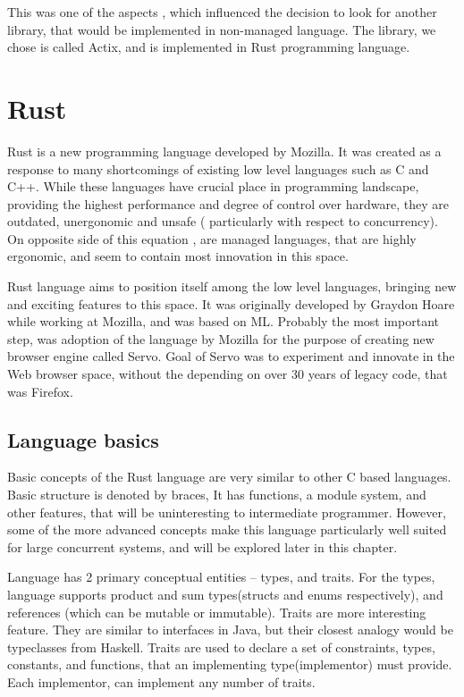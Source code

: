 
This was one of the aspects , which influenced the decision to look for another library, that would be implemented in
non-managed language. The library, we chose is called Actix\cite{web:actix}, and is implemented in Rust\cite{Blandy:2015:RPL:3019371}
programming language.

\section{Rust}
Rust is a new programming language developed by Mozilla. It was created as a response to many shortcomings of existing low level
languages such as C and C++. While these languages have crucial place in programming landscape, providing the highest performance and
degree of control over hardware, they are outdated, unergonomic and unsafe ( particularly with respect to concurrency). On opposite
side of this equation , are managed languages, that are highly ergonomic, and seem to contain most innovation in this space.

Rust language aims to position itself among the low level languages, bringing new and exciting features to this space.
It was originally developed by Graydon Hoare\cite{web:rust_progress} while working at Mozilla, and was based on
ML. Probably the most important step, was adoption of the language by Mozilla for the purpose of creating new browser engine
called Servo\cite{proc:servo}. Goal of Servo was to experiment and innovate in the Web browser space, without
the depending on over 30 years of legacy code, that was Firefox.

\subsection{Language basics}
Basic concepts of the Rust language are very similar to other C based languages. Basic structure is denoted by braces,
It has functions, a module system, and other features, that will be uninteresting to intermediate programmer.
However, some of the more advanced concepts make this language particularly well suited for large concurrent systems, and
will be explored later in this chapter.

Language has 2 primary conceptual entities -- types, and traits.
For the types, language supports product and sum types(structs and enums respectively), and references (which can be mutable or immutable).
Traits are more interesting feature. They are similar to interfaces in Java, but their closest analogy would be typeclasses from Haskell.
Traits are used to declare a set of constraints, types, constants, and functions, that an implementing type(implementor) must provide.
Each implementor, can implement any number of traits.

